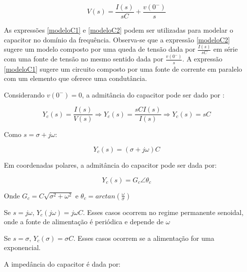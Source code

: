 \documentclass[12pt,fleqn]{book} %
\begin{document}
        \begin{equation}\label{modeloC2}
        V(s) = \frac{I(s)}{sC} + \frac{v(0^-)}{s} 
        \end{equation}
        
        As expressões \ref{modeloC1} e \ref{modeloC2} podem ser utilizadas para modelar o capacitor no domínio da frequência. Observa-se que a expressão \ref{modeloC2} sugere um modelo composto por uma queda de tensão dada por $\frac{I(s)}{sC}$ em série com uma fonte de tensão no mesmo sentido dada por $\frac{v(0^-)}{s}$. A expressão \ref{modeloC1} sugere um circuito composto por uma fonte de corrente em paralelo com um elemento que oferece uma condutância.
        
        Considerando $v(0^-) = 0$, a admitância do capacitor pode ser dado por :
        
        \begin{equation}
        Y_c(s) = \frac{I(s)}{V(s)}\Rightarrow Y_c(s) = \frac{sCI(s)}{I(s)}\Rightarrow Y_c(s) = sC
        \end{equation}
        
        Como $s = \sigma + j\omega$:
        
        \begin{equation}
        Y_c(s) = (\sigma+j\omega)C
        \end{equation}
        
        Em coordenadas polares, a admitância do capacitor pode ser dada por:
        
        \begin{equation}
        Y_c(s) = G_c \angle\theta_c
        \end{equation}
        
        Onde $G_c = C\sqrt{\sigma^2+\omega^2}$ e $\theta_c = arctan(\frac{\omega}{\sigma})$
        
        \begin{remark}
        Se $s = j\omega$, $Y_c(j\omega) = j\omega C$. Esses casos ocorrem no regime permanente senoidal, onde a fonte de alimentação é periódica e depende de $\omega$
        \end{remark}
        
        \begin{remark}
        Se $s = \sigma$, $Y_c(\sigma) = \sigma C$. Esses casos ocorrem se a alimentação for uma exponencial.
        \end{remark}
        
        A impedância do capacitor é dada por:
        
\end{document}
